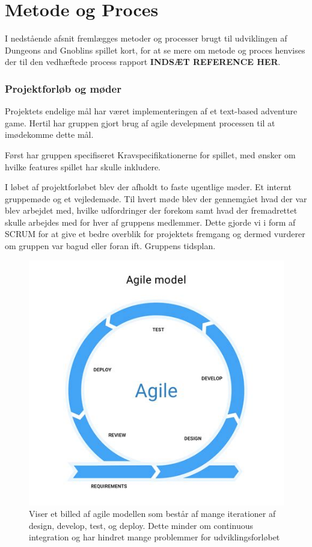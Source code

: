 \newpage

\section{Metode og Proces}
I nedstående afsnit fremlægges metoder og processer brugt til udviklingen af
Dungeons and Gnoblins spillet kort, for at se mere om metode og proces henvises der til den vedhæftede process rapport \textbf{INDSÆT REFERENCE HER}.

\subsubsection{Projektforløb og møder}
Projektets endelige mål har været implementeringen af et text-based adventure game.
Hertil har gruppen gjort brug af agile develepment processen til at imødekomme dette mål.

Først har gruppen specifiseret Kravspecifikationerne for spillet, med ønsker om
hvilke features spillet har skulle inkludere.

I løbet af projektforløbet blev der afholdt to faste ugentlige møder. Et internt gruppemøde og et vejledemøde. Til hvert møde blev der gennemgået hvad der var blev arbejdet med, hvilke udfordringer der forekom samt hvad der fremadrettet skulle arbejdes med for hver af gruppens medlemmer. Dette gjorde vi i form af SCRUM for at give et bedre overblik for projektets fremgang og dermed vurderer om gruppen var bagud eller foran ift. Gruppens tidsplan.

\begin{figure}[H]
  \centering
  \includegraphics[scale=.5]{02-Body/Images/Agile.png}
  \caption{Viser et billed af agile modellen som består af mange iterationer
           af design, develop, test, og deploy. Dette minder om continuous integration
           og har hindret mange problemmer for udviklingsforløbet}
  \label{fig:Agile}
\end{figure}

